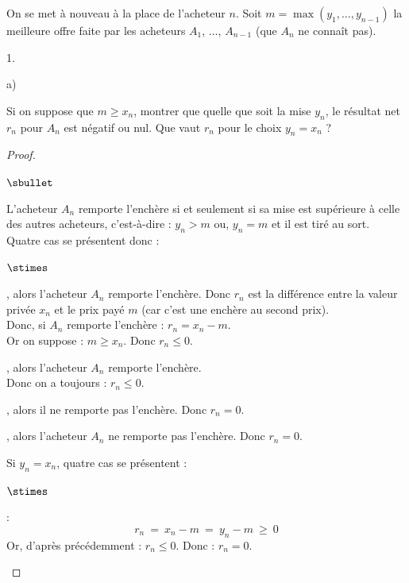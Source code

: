\documentclass[11pt]{article}%
\begin{document}
\noindent
On se met à nouveau à la place de l'acheteur $n$. Soit $m = \max(y_1, 
\ldots, y_{n-1})$ la meilleure offre faite par les acheteurs $A_1$, 
$\ldots$, $A_{n-1}$ (que $A_n$ ne connaît pas).
\begin{noliste}{1.}
  \setlength{\itemsep}{4mm}
  \setcounter{enumi}{11}
  \item \begin{noliste}{a)}
    \setlength{\itemsep}{2mm}
    \item Si on suppose que $m \geq x_n$, montrer que quelle que soit la
    mise $y_n$, le résultat net $r_n$ pour $A_n$ est négatif ou nul. 
    Que vaut $r_n$ pour le choix $y_n = x_n$ ?
    
    \begin{proof}~
      \begin{noliste}{$\sbullet$}
	\item L'acheteur $A_n$ remporte l'enchère si et seulement si
	sa mise est supérieure à celle des autres acheteurs, 
	c'est-à-dire : $y_n > m$ ou, $y_n=m$ et il est tiré au sort.\\
	Quatre cas se présentent donc :
	\begin{noliste}{$\stimes$}
	  \item {}, alors l'acheteur $A_n$
	  remporte l'enchère. Donc $r_n$ est la différence entre 
	  la valeur privée $x_n$ et le prix payé $m$ (car c'est une 
	  enchère au second prix).\\
	  Donc, si $A_n$ remporte l'enchère : $r_n = x_n -m$.\\
	  Or on suppose : $m \geq x_n$. Donc $r_n \leq 0$.
	  
	  \item {}, alors l'acheteur $A_n$ remporte l'enchère.\\
	  Donc on a toujours : $r_n \leq 0$.
	  
	  \item {}, alors il ne remporte pas 
	  l'enchère. Donc $r_n=0$.
	  
	  \item {}, alors l'acheteur $A_n$ ne 
	  remporte pas l'enchère. Donc $r_n=0$.
	\end{noliste}
	
	\item Si $y_n =x_n$, quatre cas se présentent :
	\begin{noliste}{$\stimes$}
	  \item {} :
	  \[
	    r_n \ = \ x_n-m \ = \ y_n - m \ \geq \ 0
	  \]
	  Or, d'après précédemment : $r_n \leq 0$. Donc : $r_n=0$.
	  

\end{noliste}
\end{noliste}
\end{proof}
\end{noliste}
\end{noliste}
\end{document}
